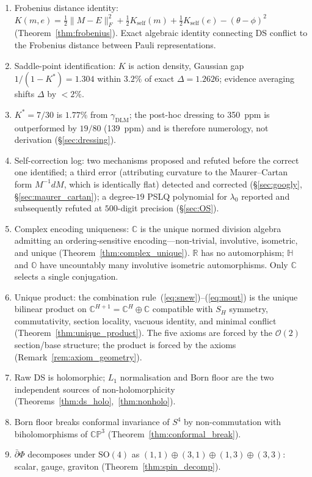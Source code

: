 \documentclass[11pt,a4paper]{article}
\theoremstyle{definition}
\theoremstyle{remark}
\newcommand{\CP}{\mathbb{CP}}
\newcommand{\C}{\mathbb{C}}
\newcommand{\R}{\mathbb{R}}
\newcommand{\dbar}{\bar{\partial}}
\begin{document}
\begin{enumerate}[nosep]
\item Frobenius distance identity: $K(m,e)=\frac{1}{2}\|M-E\|_F^2+\frac{1}{2}K_{\mathrm{self}}(m)+\frac{1}{2}K_{\mathrm{self}}(e)-(\theta-\phi)^2$ (Theorem~\ref{thm:frobenius}). Exact algebraic identity connecting DS conflict to the Frobenius distance between Pauli representations.
\item Saddle-point identification: $K$ is action density, Gaussian gap $1/(1-K^*)=1.304$ within $3.2\%$ of exact $\Delta=1.2626$; evidence averaging shifts $\Delta$ by $<2\%$.
\item $K^*=7/30$ is $1.77\%$ from $\gamma_{\mathrm{DLM}}$; the post-hoc dressing to 350~ppm is outperformed by $19/80$ (139~ppm) and is therefore numerology, not derivation (\S\ref{sec:dressing}).
\item Self-correction log: two mechanisms proposed and refuted before the correct one identified; a third error (attributing curvature to the Maurer--Cartan form $M^{-1}dM$, which is identically flat) detected and corrected (\S\ref{sec:googly}, \S\ref{sec:maurer_cartan}); a degree-$19$ PSLQ polynomial for $\lambda_0$ reported and subsequently refuted at $500$-digit precision (\S\ref{sec:OS}).
\item Complex encoding uniqueness: $\C$ is the unique normed division algebra admitting an ordering-sensitive encoding---non-trivial, involutive, isometric, and unique (Theorem~\ref{thm:complex_unique}). $\R$ has no automorphism; $\mathbb{H}$ and $\mathbb{O}$ have uncountably many involutive isometric automorphisms. Only $\C$ selects a single conjugation.
\item Unique product: the combination rule~(\ref{eq:snew})--(\ref{eq:mout}) is the unique bilinear product on $\C^{H+1}=\C^H\oplus\C$ compatible with $S_H$ symmetry, commutativity, section locality, vacuous identity, and minimal conflict (Theorem~\ref{thm:unique_product}). The five axioms are forced by the $\mathcal{O}(2)$ section/base structure; the product is forced by the axioms (Remark~\ref{rem:axiom_geometry}).
\item Raw DS is holomorphic; $L_1$ normalisation and Born floor are the two independent sources of non-holomorphicity (Theorems~\ref{thm:ds_holo},~\ref{thm:nonholo}).
\item Born floor breaks conformal invariance of $S^4$ by non-commutation with biholomorphisms of $\CP^3$ (Theorem~\ref{thm:conformal_break}).
\item $\dbar\Phi$ decomposes under $\mathrm{SO}(4)$ as $(1,1)\oplus(3,1)\oplus(1,3)\oplus(3,3)$: scalar, gauge, graviton (Theorem~\ref{thm:spin_decomp}).

\end{enumerate}
\end{document}
